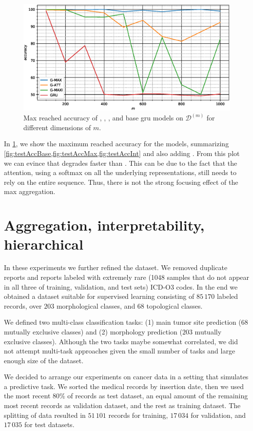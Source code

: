 \begin{figure}
  \centering
  \includegraphics[width=\floatwidth]{imgMax/maxBaseDiff.eps}
  \caption{Max reached accuracy of \maxp{}, \softmax{}, \maxi{}, and
    base \ac{gru} models on
    $\mathcal{D}^{(m)}$ for different dimensions of $m$.} 
  \label{fig:testAccDiff}
\end{figure}
In \cref{fig:testAccDiff}, we show the maximum reached accuracy for the
models, summarizing
\cref{fig:testAccBase,fig:testAccMax,fig:testAccInt} and also adding
\softmax{}. From this plot we can evince that \softmax{} degrades
faster than \maxp{}. This can be due to the fact that the attention,
using a softmax on all the underlying representations,
still needs to rely on the entire sequence. Thus, there is not the
strong focusing effect of the max aggregation.


\section{Aggregation, interpretability, hierarchical}
\label{ch:icdo}
In these experiments we further refined the dataset. We removed duplicate
reports and reports labeled with extremely rare (1048
samples that do not
appear in all three of training, validation, and test sets) ICD-O3
codes. In the end we
obtained 
a dataset suitable for supervised learning consisting of $85\,170$
labeled records, over $203$ morphological classes, and $68$
topological classes.

We defined two multi-class classification tasks: (1) main tumor site
prediction ($68$ mutually exclusive classes) and (2) morphology
prediction ($203$ mutually exclusive
classes). Although the two tasks maybe somewhat correlated, we did not
attempt multi-task approaches given the small number of tasks and
large enough size of the dataset.

We decided to arrange our experiments on cancer
data in 
a setting that simulates a predictive task. We sorted the medical
records by insertion date, then we used the most recent $80\%$ of
records as test 
dataset, an equal amount of the remaining most recent records as
validation dataset, and the rest as training dataset. The splitting of
data resulted in $51\,101$ records for training,
$17\,034$ for validation, and $17\,035$ for test datasets.

